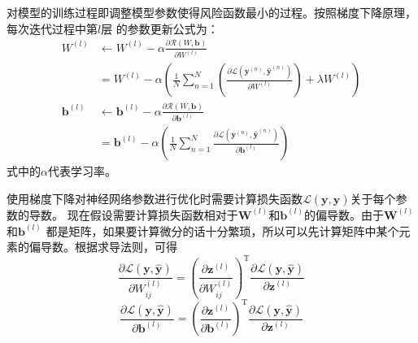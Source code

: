 对模型的训练过程即调整模型参数使得风险函数最小的过程。按照梯度下降原理，每次迭代过程中第$l$层
的参数更新公式为：
\begin{equation} 
\begin{aligned} W^{(l)} & \leftarrow W^{(l)}-\alpha \frac{\partial \mathcal{R}(W, \mathbf{b})}{\partial W^{(l)}} \\ &=W^{(l)}-\alpha\left(\frac{1}{N} \sum_{n=1}^{N}\left(\frac{\partial \mathcal{L}\left(\mathbf{y}^{(n)}, \hat{\mathbf{y}}^{(n)}\right)}{\partial W^{(l)}}\right)+\lambda W^{(l)}\right) \\ \mathbf{b}^{(l)} & \leftarrow \mathbf{b}^{(l)}-\alpha \frac{\partial \mathcal{R}(W, \mathbf{b})}{\partial \mathbf{b}^{(l)}} \\ &=\mathbf{b}^{(l)}-\alpha\left(\frac{1}{N} \sum_{n=1}^{N} \frac{\partial \mathcal{L}\left(\mathbf{y}^{(n)}, \hat{\mathbf{y}}^{(n)}\right)}{\partial \mathbf{b}^{(l)}}\right) \end{aligned}
\end{equation}
式中的$\alpha$代表学习率。

使用梯度下降对神经网络参数进行优化时需要计算损失函数$\mathcal{L}(\mathbf{y}, \hat{\mathbf{y}})$关于每个参数的导数。
现在假设需要计算损失函数相对于$\mathbf{W}^{(l)}$和$\mathbf{b}^{(l)}$的偏导数。由于$\mathbf{W}^{(l)}$和$\mathbf{b}^{(l)}$
都是矩阵，如果要计算微分的话十分繁琐，所以可以先计算矩阵中某个元素的偏导数。根据求导法则，可得
\begin{equation} 
	\label{eqn:partial_l_partial_w}
	\frac{\partial \mathcal{L}(\mathbf{y}, \hat{\mathbf{y}})}{\partial W_{i j}^{(l)}}=\left(\frac{\partial \mathbf{z}^{(l)}}{\partial W_{i j}^{(l)}}\right)^{\mathrm{T}} \frac{\partial \mathcal{L}(\mathbf{y}, \hat{\mathbf{y}})}{\partial \mathbf{z}^{(l)}}
 \end{equation}
 \begin{equation}
	\label{eqn:partial_l_partial_b} 
 \frac{\partial \mathcal{L}(\mathbf{y}, \hat{\mathbf{y}})}{\partial \mathbf{b}^{(l)}}=\left(\frac{\partial \mathbf{z}^{(l)}}{\partial \mathbf{b}^{(l)}}\right)^{\mathrm{T}} \frac{\partial \mathcal{L}(\mathbf{y}, \hat{\mathbf{y}})}{\partial \mathbf{z}^{(l)}}
  \end{equation}

